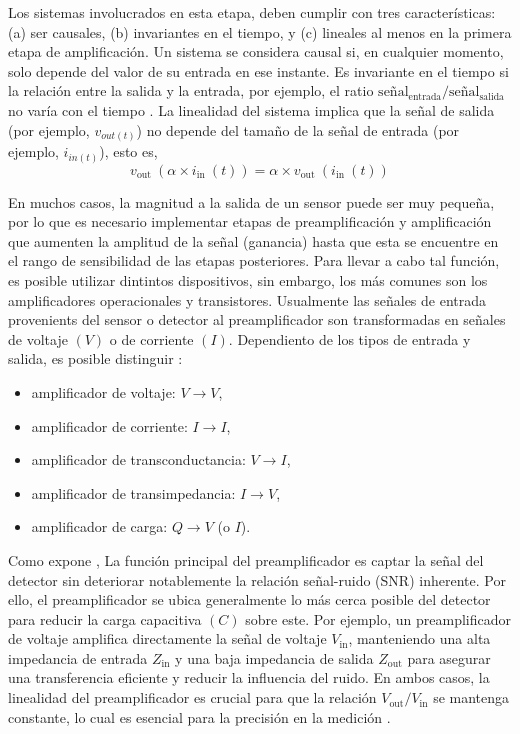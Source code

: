 \documentclass{report}
\begin{document}
\noindent Los sistemas involucrados en esta etapa, deben cumplir con tres características: (a) ser causales, (b) invariantes en el tiempo, y (c) lineales al menos en la primera etapa de amplificación. Un sistema se considera causal si, en cualquier momento, solo depende del valor de su entrada en ese instante. Es invariante en el tiempo si la relación entre la salida y la entrada, por ejemplo, el ratio $\text{señal}_{\text{entrada}}/\text{señal}_{\text{salida}}$ no varía con el tiempo \cite{kolanoski3}. La linealidad del sistema implica que la señal de salida (por ejemplo, $v_{out(t)}$) no depende del tamaño de la señal de entrada (por ejemplo, $i_{in(t)}$), esto es, 
\begin{equation}
    v_{\text {out }}\left(\alpha \times i_{\text {in }}(t)\right)=\alpha \times v_{\text {out }}\left(i_{\text {in }}(t)\right)
\end{equation}

\noindent En muchos casos, la magnitud a la salida de un sensor puede ser muy pequeña, por lo que es necesario implementar etapas de preamplificación y amplificación que aumenten la amplitud de la señal (ganancia) hasta que esta se encuentre en el rango de sensibilidad de las etapas posteriores. Para llevar a cabo tal función, es posible utilizar dintintos dispositivos, sin embargo, los más comunes son los amplificadores operacionales y transistores. Usualmente las señales de entrada provenients del sensor o detector al preamplificador son transformadas en señales de voltaje $(V)$ o de corriente $(I)$. Dependiento de los tipos de entrada y salida, es posible distinguir \cite{kolanoski4}:

\begin{itemize}
    \item amplificador de voltaje: $V \rightarrow V$,
    \item amplificador de corriente: $I \rightarrow I$,
    \item amplificador de transconductancia: $V \rightarrow I$,
    \item amplificador de transimpedancia: $I \rightarrow V$,
    \item amplificador de carga: $Q \rightarrow V$ (o $I$).
\end{itemize}

\noindent Como expone \cite{knoll3}, La función principal del preamplificador es captar la señal del detector sin deteriorar notablemente la relación señal-ruido (SNR) inherente. Por ello, el preamplificador se ubica generalmente lo más cerca posible del detector para reducir la carga capacitiva $(C)$ sobre este. Por ejemplo, un preamplificador de voltaje amplifica directamente la señal de voltaje $V_{\text{in}}$, manteniendo una alta impedancia de entrada $Z_{\text{in}}$ y una baja impedancia de salida $Z_{\text{out}}$ para asegurar una transferencia eficiente y reducir la influencia del ruido. En ambos casos, la linealidad del preamplificador es crucial para que la relación $V_{\text{out}}/ V_{\text{in}}$ se mantenga constante, lo cual es esencial para la precisión en la medición \cite{leo1994techniques}.\\
\end{document}
